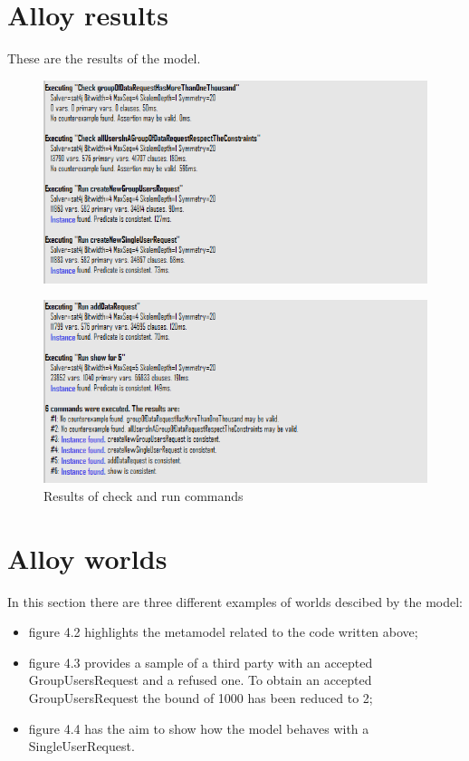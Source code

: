 \section{Alloy results}
 These are the results of the model.
\begin{figure}[h!]
	\includegraphics[width=1.00\textwidth]{./pictures/alloy_execute1.PNG}
\end{figure}
\begin{figure}[h!]
	\includegraphics[width=1.00\textwidth]{./pictures/alloy_execute2.PNG}\par
	\caption{Results of check and run commands}
\end{figure}

\section{Alloy worlds}
In this section there are three different examples of worlds descibed by the model:
\begin{itemize}
	\item figure 4.2 highlights the metamodel related to the code written above;
	\item figure 4.3 provides a sample of a third party with an accepted GroupUsersRequest and a refused one. To obtain an 			accepted GroupUsersRequest the bound of 1000 has been reduced to 2; 
	\item figure 4.4 has the aim to show how the model behaves with a SingleUserRequest.
	
\end{itemize}

